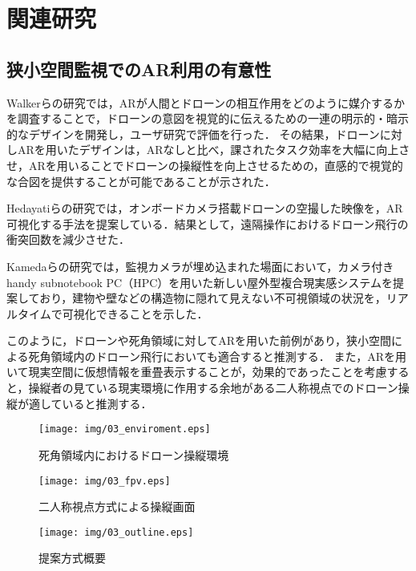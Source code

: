 \documentclass[submit]{ipsj}
\begin{document}
\section{関連研究}
\subsection{狭小空間監視でのAR利用の有意性}
Walkerらの研究\cite{book-ar01}では，ARが人間とドローンの相互作用をどのように媒介するかを調査することで，ドローンの意図を視覚的に伝えるための一連の明示的・暗示的なデザインを開発し，ユーザ研究で評価を行った．
その結果，ドローンに対しARを用いたデザインは，ARなしと比べ，課されたタスク効率を大幅に向上させ，ARを用いることでドローンの操縦性を向上させるための，直感的で視覚的な合図を提供することが可能であることが示された．

Hedayatiらの研究\cite{book-ar02}では，オンボードカメラ搭載ドローンの空撮した映像を，AR可視化する手法を提案している．結果として，遠隔操作におけるドローン飛行の衝突回数を減少させた．

Kamedaらの研究\cite{book-ar03}では，監視カメラが埋め込まれた場面において，カメラ付きhandy subnotebook PC（HPC）を用いた新しい屋外型複合現実感システムを提案しており，建物や壁などの構造物に隠れて見えない不可視領域の状況を，リアルタイムで可視化できることを示した．

このように，ドローンや死角領域に対してARを用いた前例があり，狭小空間による死角領域内のドローン飛行においても適合すると推測する．
また，ARを用いて現実空間に仮想情報を重畳表示することが，効果的であったことを考慮すると，操縦者の見ている現実環境に作用する余地がある二人称視点でのドローン操縦が適していると推測する．

\begin{figure}[tb]
  \centering
  \texttt{[image: img/03\_enviroment.eps]}
  \caption{死角領域内におけるドローン操縦環境}
  \label{fig:03_enviroment}
  \end{figure}
  
  \begin{figure}[tb]
    \centering
    \texttt{[image: img/03\_fpv.eps]}
    \caption{二人称視点方式による操縦画面}
    \label{fig:03_FPV}
  \end{figure}
  
  \begin{figure}[tb]
  \centering
  \texttt{[image: img/03\_outline.eps]}
  \caption{提案方式概要}
  \label{fig:03_outline}
  \end{figure}
\end{document}
